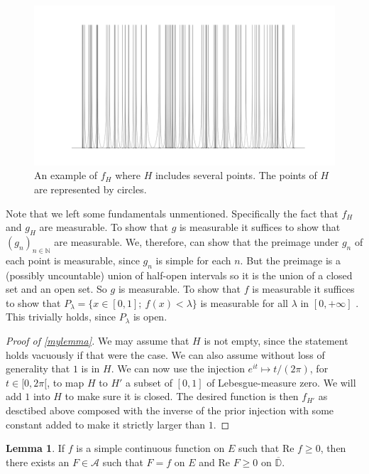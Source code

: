 \documentclass[a4paper,12pt,twoside,BCOR=10mm]{scrbook}
\theoremstyle{definition}
\theoremstyle{definition}
\newtheorem{lemma}[theorem]{Lemma}
\theoremstyle{definition}
\renewcommand{\Re}{\text{Re }}
\begin{document}
\begin{figure}[h]
\centering
\includegraphics[width=1\textwidth]{graph101}
\caption{An example of $f_H$ where $H$ includes several points. The points of $H$ are represented by circles. }
\end{figure}
Note that we left some fundamentals unmentioned.
Specifically the fact that $f_H$ and $g_H$ are measurable.
To show that $g$ is measurable it suffices to show that $(g_n)_{n \in \mathbb{N}}$ are measurable.
We, therefore, can show that the preimage under $g_n$ of each point is measurable, since $g_n$ is simple for each $n$.
But the preimage is a (possibly uncountable) union of half-open intervals so it is the union of a closed set and an open set.
So $g$ is measurable.
To show that $f$ is measurable it suffices to show that $P_{\lambda} = \{x \in [0, 1];\ f(x) < \lambda\}$ is measurable for all $\lambda$ in $[0, +\infty]$ \citep[lemma $1.3.9$]{tao}.
This trivially holds, since $P_{\lambda}$ is open.
\begin{proof}[Proof of \ref{mylemma}]
We may assume that $H$ is not empty, since the statement holds vacuously if that were the case.
We can also assume without loss of generality that $1$ is in $H$.
We can now use the injection $e^{it} \mapsto t/(2\pi)$, for $t \in [0, 2\pi[$,  to map $H$ to $H'$ a subset of $[0, 1]$ of Lebesgue-measure zero.
We will add $1$ into $H$ to make sure it is closed.
The desired function is then $f_{H'}$ as desctibed above composed with the inverse of the prior injection with some constant added to make it strictly larger than $1$.
\end{proof}
\begin{lemma}
\label{rudinlemma1}
If $f$ is a simple continuous function on $E$ such that $\Re f \geq 0$, then there exists an $F \in \mathcal{A}$ such that $F = f$ on $E$ and $\Re F \geq 0$ on $\overline{\mathbb{D}}$.
\end{lemma}
\end{document}
